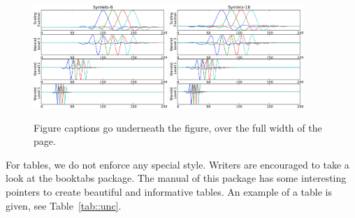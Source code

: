 \documentclass[12pt]{article}
\begin{document}
\begin{figure}[ht!]
  \begin{center}
    \includegraphics[width=0.45\textwidth]{sym6-crop.pdf}
    \includegraphics[width=0.45\textwidth]{sym10-crop.pdf}
    \caption[]{\label{fig::sym6}Figure captions go underneath the figure, over the full width of the page.}%
  \end{center}
\end{figure}

For tables, we do not enforce any special style. Writers are encouraged to take a look at the booktabs package. The manual of this package has some interesting pointers to create beautiful and informative tables. An example of a table is given, see Table~\ref{tab::unc}.
\end{document}
